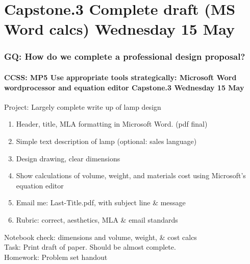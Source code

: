 \documentclass{beamer}
\begin{document}
\section{Capstone.3 Complete draft (MS Word calcs) Wednesday 15 May}
  \frame
  {
    \frametitle{GQ: How do we complete a professional design proposal?}
    \framesubtitle{CCSS: MP5 Use appropriate tools strategically: Microsoft Word wordprocessor and equation editor \hfill \alert{Capstone.3 Wednesday 15 May}}

    \begin{block}{Project: Largely complete write up of lamp design}
      \begin{enumerate}
        \item Header, title, MLA formatting in Microsoft Word. (pdf final)
        \item Simple text description of lamp (optional: sales language)
        \item Design drawing, clear dimensions
        \item Show calculations of volume, weight, and materials cost using Microsoft's equation editor
        \item Email me: Last-Title.pdf, with subject line \& message
        \item Rubric: correct, aesthetics, MLA \& email standards
      \end{enumerate}
    \end{block}
    Notebook check: dimensions and volume, weight, \& cost calcs\\
    Task: Print draft of paper. Should be almost complete.\\
    Homework: Problem set handout
  }
\end{document}
